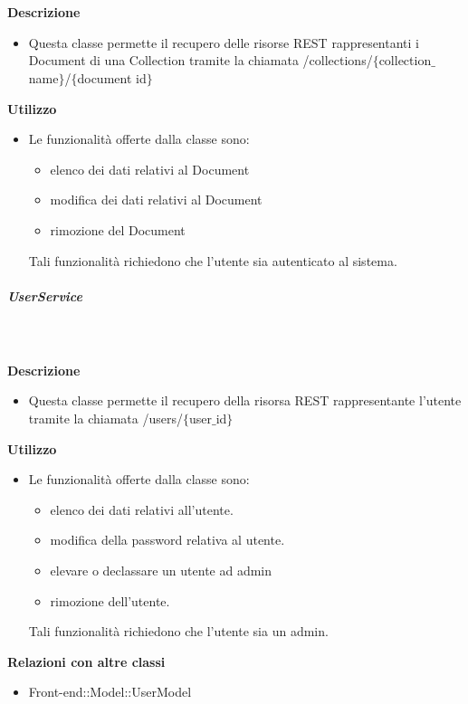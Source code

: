 				\textbf{\\ \\ Descrizione} 
					\begin{itemize}
						\item[] Questa classe permette il recupero delle risorse REST rappresentanti i Document di una Collection tramite la chiamata /collections/$\{$collection$\_$name$\}$/$\{$document id$\}$
					\end{itemize}      
				\textbf{Utilizzo}  
					\begin{itemize}
						\item[] Le funzionalità offerte dalla classe sono: 
\begin{itemize} 
\item elenco dei dati relativi al Document 
\item modifica dei dati relativi al Document
\item rimozione del Document 
\end{itemize} 
Tali funzionalità richiedono che l'utente sia autenticato al sistema.
					\end{itemize}
			\subparagraph{UserService}
				
				\textbf{\\ \\ Descrizione} 
					\begin{itemize}
						\item[] Questa classe permette il recupero della risorsa REST rappresentante l'utente tramite la chiamata /users/$\{$user$\_$id$\}$
					\end{itemize}      
				\textbf{Utilizzo}  
					\begin{itemize}
						\item[] Le funzionalità offerte dalla classe sono: 
\begin{itemize} 
\item elenco dei dati relativi all'utente. 
\item modifica della password relativa al utente.
\item elevare o declassare un utente ad admin 
\item rimozione dell'utente.
\end{itemize}
Tali funzionalità richiedono che l'utente sia un admin.
					\end{itemize}
					\textbf{Relazioni con altre classi}
					\begin{itemize}
							\item{Front-end::Model::UserModel}
					\end{itemize}
